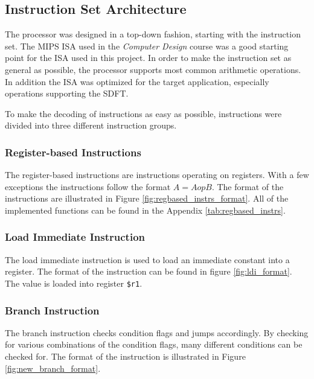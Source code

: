 \subsection{Instruction Set Architecture}\label{section:fpga-isa}

The processor was designed in a top-down fashion, starting with the instruction
set. The MIPS ISA used in the \textit{Computer
Design}\cite{tdt4255} course was a good starting point for the ISA used in this
project. In order to make the instruction set as general as possible, the
processor supports most common arithmetic operations. In addition the ISA was
optimized for the target application, especially operations supporting the SDFT.

To make the decoding of instructions as easy as possible, instructions
were divided into three different instruction groups.

\subsubsection{Register-based Instructions}

The register-based instructions are instructions operating on registers. With a
few exceptions the instructions follow the format $A = A op B$. The format of the
instructions are illustrated in Figure \ref{fig:regbased_instrs_format}. All of the
implemented functions can be found in the Appendix \ref{tab:regbased_instrs}.


\FloatBarrier

\subsubsection{Load Immediate Instruction}
The load immediate instruction is used to load an immediate constant into a
register. The format of the instruction can be found in figure
\ref{fig:ldi_format}. The value is loaded into register \texttt{\$r1}.


\FloatBarrier

\subsubsection{Branch Instruction}
The branch instruction checks condition flags and jumps accordingly. By
checking for various combinations of the condition flags, many different
conditions can be checked for. The format of the instruction is illustrated
in Figure \ref{fig:new_branch_format}.

